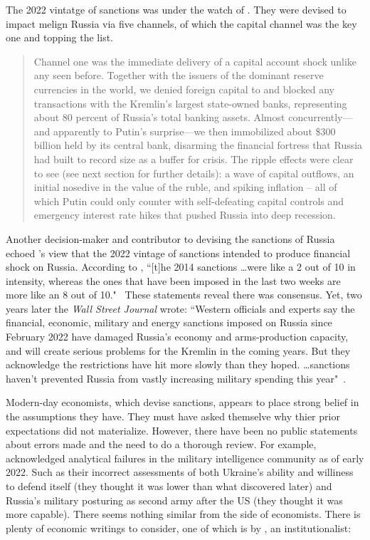 The 2022 vintatge of sanctions was under the watch of \cite{singh2022}. They were devised to impact melign Russia via five channels, of which the capital channel was the key one and topping the list. 

\begin{quote}
Channel one was the immediate delivery of a capital account shock unlike any seen before.
Together with the issuers of the dominant reserve currencies in the world, we denied foreign capital to and blocked any transactions with the Kremlin's largest state-owned banks,
representing about 80 percent of Russia's total banking assets. Almost concurrently---and
apparently to Putin's surprise---we then immobilized about \$300 billion held by its central bank,
disarming the financial fortress that Russia had built to record size as a buffer for crisis. The
ripple effects were clear to see (see next section for further details): a wave of capital outflows,
an initial nosedive in the value of the ruble, and spiking inflation -- all of which Putin could only
counter with self-defeating capital controls and emergency interest rate hikes that pushed
Russia into deep recession.~\citep[pp.~1-2]{singh2022}
\end{quote}

Another decision-maker and contributor to devising the sanctions of Russia \cite{fishman2025} echoed \citeauthor{singh2022}'s view that the 2022 vintage of sanctions intended to produce financial shock on Russia. According to \citeauthor{fishman2025}, ``[t]he 2014 sanctions \dots were like a 2 out of 10 in intensity, whereas the ones that have been imposed in the last two weeks are more like an 8 out of 10."~\citep{wsj2022} These statements reveal there was consensus. Yet, two years later the \textit{Wall Street Journal} wrote: ``Western officials and experts say the financial, economic, military and energy sanctions imposed on Russia since February 2022 have damaged Russia's economy and arms-production capacity, and will create serious problems for the Kremlin in the coming years. But they acknowledge the restrictions have hit more slowly than they hoped. \dots sanctions haven't
prevented Russia from vastly increasing military spending this year"~\citep{wsj2024}. 

Modern-day economists, which devise sanctions, appears to place strong belief in the assumptions they have. They must have asked themselve why thier prior expectations did not materialize. However, there have been no public statements about errors made and the need to do a thorough review. For example, \cite{csis2024} acknowledged analytical failures in the military intelligence community as of early 2022. Such as their incorrect assessments of both Ukraine's ability and williness to defend itself (they thought it was lower than what discovered later) and Russia's military posturing as second army after the US (they thought it was more capable). There seems nothing similar from the side of economists. There is plenty of economic writings to consider, one of which is by \citeauthor{ayres1944}, an institutionalist:

